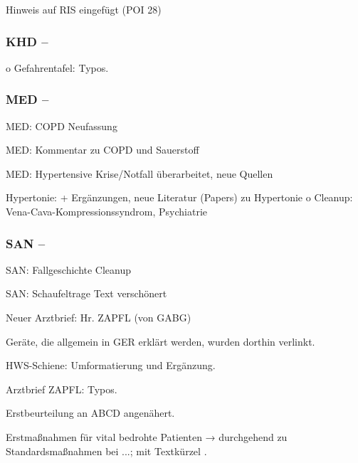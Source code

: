 \documentclass[ngerman,a4paper,fontsize=9pt,BCOR=0cm,DIV=11,headings=big,draft=no]{scrreprt}
\begin{document}
Hinweis auf RIS eingefügt (POI 28)



\subsubsection{KHD -- }


          o Gefahrentafel: Typos.

\subsubsection{MED -- }

MED: COPD Neufassung

MED: Kommentar zu COPD und
Sauerstoff

 MED: Hypertensive Krise/Notfall überarbeitet, neue
 Quellen


Hypertonie:  + Ergänzungen, neue Literatur (Papers) zu Hypertonie o Cleanup: Vena-Cava-Kompressionssyndrom, Psychiatrie

\subsubsection{SAN -- }

SAN: Fallgeschichte Cleanup

SAN: Schaufeltrage Text
verschönert

Neuer Arztbrief: Hr.
          ZAPFL (von GABG)


Geräte, die allgemein in
          GER erklärt werden, wurden dorthin verlinkt.

 HWS-Schiene:
          Umformatierung und Ergänzung.

 Arztbrief ZAPFL: Typos.

 Erstbeurteilung an ABCD
          angenähert.

Erstmaßnahmen für vital
          bedrohte Patienten → durchgehend zu Standardsmaßnahmen bei ...; mit Textkürzel \gTxMassVit .
\end{document}

